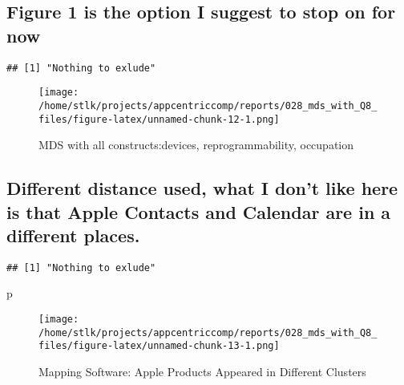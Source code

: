 \documentclass[]{article}
\newenvironment{Shaded}{\begin{snugshade}}{\end{snugshade}}
\newcommand{\KeywordTok}[1]{\textcolor[rgb]{0.13,0.29,0.53}{\textbf{{#1}}}}
\newcommand{\DataTypeTok}[1]{\textcolor[rgb]{0.13,0.29,0.53}{{#1}}}
\newcommand{\DecValTok}[1]{\textcolor[rgb]{0.00,0.00,0.81}{{#1}}}
\newcommand{\StringTok}[1]{\textcolor[rgb]{0.31,0.60,0.02}{{#1}}}
\newcommand{\NormalTok}[1]{{#1}}
\begin{document}
\subsection{Figure 1 is the option I suggest to stop on for
now}\label{figure-1-is-the-option-i-suggest-to-stop-on-for-now}

\begin{verbatim}
## [1] "Nothing to exlude"
\end{verbatim}

\begin{figure}[htbp]
\centering
\texttt{[image: /home/stlk/projects/appcentriccomp/reports/028\_mds\_with\_Q8\_files/figure-latex/unnamed-chunk-12-1.png]}
\caption{MDS with all constructs:devices, reprogrammability, occupation}
\end{figure}

\subsection{Different distance used, what I don't like here is that
Apple Contacts and Calendar are in a different
places.}\label{different-distance-used-what-i-dont-like-here-is-that-apple-contacts-and-calendar-are-in-a-different-places.}

\begin{Shaded}
\end{Shaded}

\begin{verbatim}
## [1] "Nothing to exlude"
\end{verbatim}

\begin{Shaded}
\begin{Highlighting}[]
\NormalTok{p}
\end{Highlighting}
\end{Shaded}

\begin{figure}[htbp]
\centering
\texttt{[image: /home/stlk/projects/appcentriccomp/reports/028\_mds\_with\_Q8\_files/figure-latex/unnamed-chunk-13-1.png]}
\caption{Mapping Software: Apple Products Appeared in Different
Clusters}
\end{figure}
\end{document}
